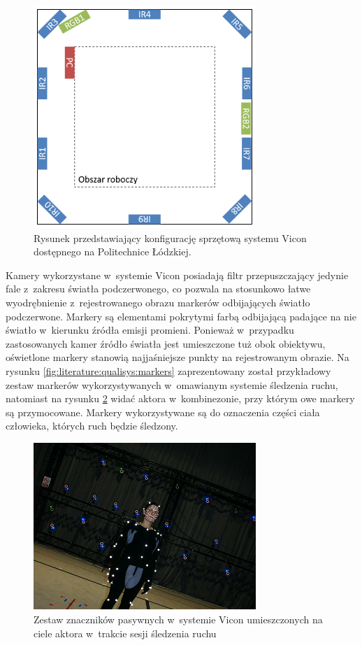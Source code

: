 \begin{figure}[!htp]
	\centering	
	\includegraphics[width=0.75\textwidth]{images/viconSetup.png}
	\caption{Rysunek przedstawiający konfigurację sprzętową systemu Vicon dostępnego na Politechnice Łódzkiej.}
	\label{fig:literature:vicon:lutSetup}
\end{figure}

Kamery wykorzystane w~systemie Vicon posiadają filtr przepuszczający jedynie fale z~zakresu światła podczerwonego, co pozwala na stosunkowo łatwe wyodrębnienie z~rejestrowanego obrazu markerów odbijających światło podczerwone. Markery są elementami pokrytymi farbą odbijającą padające na nie światło w~kierunku źródła emisji promieni. Ponieważ w~przypadku zastosowanych kamer źródło światła jest umieszczone tuż obok obiektywu, oświetlone markery stanowią najjaśniejsze punkty na rejestrowanym obrazie. Na rysunku \ref{fig:literature:qualisys:markers} zaprezentowany został przykładowy zestaw markerów wykorzystywanych w~omawianym systemie śledzenia ruchu, natomiast na rysunku \ref{fig:literature:vicon:markers} widać aktora w~kombinezonie, przy którym owe markery są przymocowane. Markery wykorzystywane są do oznaczenia części ciała człowieka, których ruch będzie śledzony.

\begin{figure}[!htp]
	\centering	
	\includegraphics[width=0.75\textwidth]{images/markers-suits-600x450.png}
	\caption{Zestaw znaczników pasywnych w~systemie Vicon umieszczonych na ciele aktora w~trakcie sesji śledzenia ruchu \cite{ViconMarkersSet}}
	\label{fig:literature:vicon:markers}
\end{figure}


